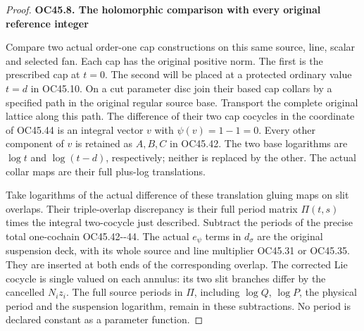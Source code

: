\begin{proof}
\par

\medskip\noindent\textbf{OC45.8. The holomorphic comparison with every original reference integer}

\par\nobreak

Compare two actual order-one cap constructions on this same
source, line, scalar and selected fan. Each cap has the original
positive norm. The first is the prescribed cap at \(t=0\).
The second will be placed at a protected ordinary value \(t=d\)
in OC45.10. On a cut parameter disc join their based cap collars
by a specified path in the original regular source base.
Transport the complete original lattice along this path.
The difference of their two cap cocycles in the coordinate
of OC45.44 is an integral vector \(v\) with \(\psi(v)=1-1=0\).
Every other component of \(v\) is retained as \(A,B,C\) in
OC45.42. The two base logarithms are \(\log t\) and
\(\log(t-d)\), respectively; neither is replaced by the other.
The actual collar maps are their full plus-log translations.

Take logarithms of the actual difference of these translation
gluing maps on slit overlaps. Their triple-overlap discrepancy
is their full period matrix \(\Pi(t,s)\) times the integral
two-cocycle just described. Subtract the periods of the precise
total one-cochain OC45.42-\/-44. The actual \(e_\psi\) terms
in \(d_\sigma\) are the original suspension deck, with its
whole source and line multiplier OC45.31 or OC45.35.
They are inserted at both ends of the corresponding overlap.
The corrected Lie cocycle is single valued on each annulus:
its two slit branches differ by the cancelled \(N_i z_i\).
The full source periods in \(\Pi\), including \(\log Q\),
\(\log P\), the physical period and the suspension logarithm,
remain in these subtractions. No period is declared constant
as a parameter function.


\end{proof}

